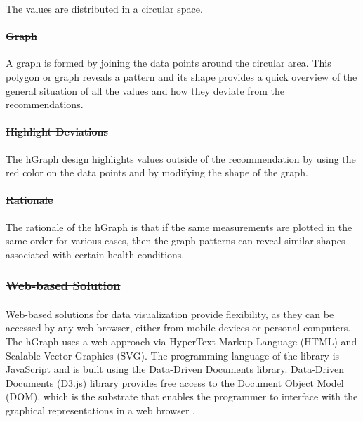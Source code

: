 \documentclass[twocolumn]{bmcart}%
\providecommand{\DIFadd}[1]{{\protect\color{blue}\uwave{#1}}} %
\providecommand{\DIFdel}[1]{{\protect\color{red}\sout{#1}}}                      %
\providecommand{\DIFaddbegin}{} %
\providecommand{\DIFaddend}{} %
\providecommand{\DIFdelbegin}{} %
\providecommand{\DIFdelend}{} %
\begin{document}
\DIFaddend The values are distributed in a circular space. \DIFdelbegin %

\paragraph*{\DIFdel{Graph}} %
\DIFdelend A graph is formed by joining the data points around the circular area. This polygon or graph reveals a pattern and its shape provides a quick overview of the general situation of all the values and how they deviate from the recommendations. \DIFdelbegin %

\paragraph*{\DIFdel{Highlight Deviations}} %
\DIFdelend The hGraph design highlights values outside of the recommendation by using the red color on the data points and by modifying the shape of the graph. \DIFdelbegin %

\paragraph*{\DIFdel{Rationale}} %
\DIFdelend The rationale of the hGraph is that if the same measurements are plotted in the same order for various cases, then the graph patterns can reveal similar shapes associated with certain health conditions.

\DIFdelbegin \subsubsection*{\DIFdel{Web-based Solution}}

\DIFdelend \DIFaddbegin \paragraph*{\DIFadd{Web-based Solution}}
\DIFaddend Web-based solutions for data visualization provide flexibility, as they can be accessed by any web browser, either from mobile devices or personal computers. The hGraph uses a web approach via HyperText Markup Language (HTML) and Scalable Vector Graphics (SVG). The programming language of the library is JavaScript and is built using the Data-Driven Documents library. Data-Driven Documents (D3.js) library provides free access to the Document Object Model (DOM), which is the substrate that enables the programmer to interface with the graphical representations in a web browser \cite{bostock2011d3}.
\end{document}
